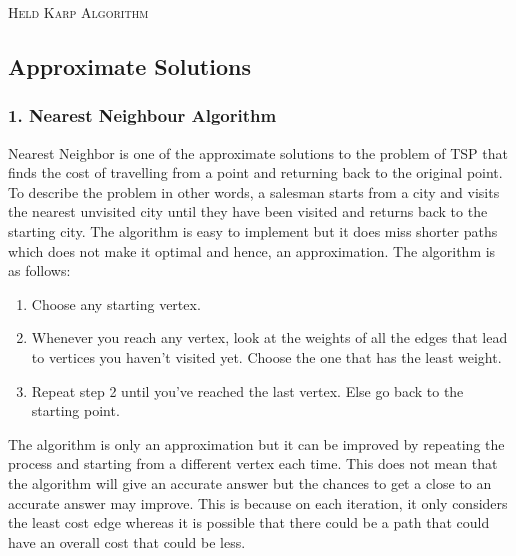 \documentclass[12pt]{report}
\begin{document}
\begin{algorithm*}
         
    \caption{\textsc{Held Karp Algorithm}}
    \end{algorithm*}        
	


\subsection{Approximate Solutions}
\subsubsection {1. Nearest Neighbour Algorithm}
		Nearest Neighbor is one of the approximate solutions to the problem of TSP that finds the cost of travelling from a point and returning back to the original point. To describe the problem in other words, a salesman starts from a city and visits the nearest unvisited city until they have been visited and returns back to the starting city. The algorithm is easy to implement but it does miss shorter paths which does not make it optimal and hence, an approximation.
		The algorithm is as follows: 
		\begin{enumerate}
		    \item Choose any starting vertex.
		    \item Whenever you reach any vertex, look at the weights of all the edges that lead to vertices you haven’t visited yet. Choose the one that has the least weight.
		    \item Repeat step 2 until you’ve reached the last vertex. Else go back to the starting point. 
		\end{enumerate}
        The algorithm is only an approximation but it can be improved by repeating the process and starting from a different vertex each time. This does not mean that the algorithm will give an accurate answer but the chances to get a close to an accurate answer may improve. This is because on each iteration, it only considers the least cost edge whereas it is possible that there could be a path that could have an overall cost that could be less.   
\end{document}
